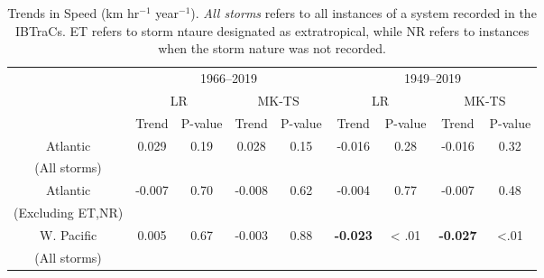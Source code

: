 \documentclass[wcd,manuscript]{copernicus}
\begin{document}
\begin{table*}[t]
  \caption{Trends in Speed (km hr$^{-1}$ year$^{-1}$). \emph{All storms} refers to all instances of a
    system recorded in the IBTraCs. ET refers to storm ntaure designated as extratropical, while NR refers to instances
    when the storm nature was not recorded. }

\begin{tabular}{|c|cccc|cccc|}
\hline
& \multicolumn{4}{|c|}{1966--2019}& \multicolumn{4}{|c|}{1949--2019}\\
& \multicolumn{2}{c}{LR} & \multicolumn{2}{c|}{MK-TS}& \multicolumn{2}{c}{LR} & \multicolumn{2}{c|}{MK-TS}\\
& Trend & P-value & Trend & P-value & Trend & P-value & Trend & P-value\\
\hline
Atlantic   &  0.029 & 0.19 &  0.028 & 0.15  & -0.016 & 0.28 & -0.016 & 0.32\\
(All storms) & & & & & & & &  \\
\hline
Atlantic  & -0.007 & 0.70 & -0.008 & 0.62 & -0.004 & 0.77 & -0.007 & 0.48\\
(Excluding ET,NR)  & & & & & & & &  \\
\hline
W. Pacific &  0.005 & 0.67 & -0.003 & 0.88 & \bf{-0.023} & < .01 & \bf{-0.027} & <.01\\
(All storms) & & & & & & & &  \\
\hline
\end{tabular}
\label{tab:ATLSA}
\end{table*}

\end{document}

